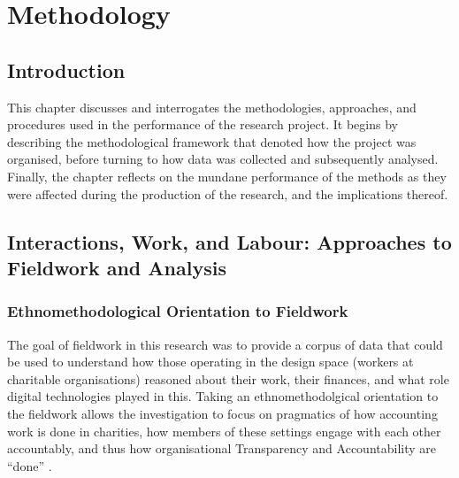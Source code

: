 \chapter{Methodology}
\label{sec:method}

\section{Introduction}
This chapter discusses and interrogates the methodologies, approaches, and procedures used in the performance of the research project. It begins by describing the methodological framework that denoted how the project was organised, before turning to how data was collected and subsequently analysed. Finally, the chapter reflects on the mundane performance of the methods as they were affected during the production of the research, and the implications thereof.
%
%
%
%


\section{Interactions, Work, and Labour: Approaches to Fieldwork and Analysis}
\label{sec:method:fieldwork}





\subsection{Ethnomethodological Orientation to Fieldwork}
The goal of fieldwork in this research was to provide a corpus of data that could be used to understand how those operating in the design space (workers at charitable organisations) reasoned about their work, their finances, and what role digital technologies played in this. Taking an ethnomethodolgical orientation to the fieldwork allows the investigation to focus on pragmatics of how accounting work is done in charities, how members of these settings engage with each other accountably, and thus how organisational Transparency and Accountability are ``done'' \cite{crabtree_doing_2012}.

